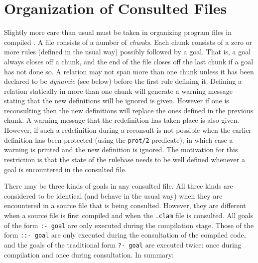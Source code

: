\section{Organization of Consulted Files}
\label{consult-section}

Slightly more care than usual must be taken in organizing program files in
compiled \CLPR. A file consists of a number of {\em chunks}. Each chunk
consists of a zero or more rules (defined in the usual way) possibly followed
by a goal. That is, a goal always closes off a chunk, and the end of the file
closes off the last chunk if a goal has not done so.
\chgbarbegin
A relation may not span more than one chunk unless it has been declared to be
{\em dynamic} (see below) before the first rule defining it. 
Defining a relation statically in more than one chunk will generate
a warning message stating that the new definitions will be ignored is given.
However if one is reconsulting then the new definitions will replace the
ones defined in the previous chunk. A warning message that the redefinition
has taken place is also given.
However, if such a redefinition during a reconsult is not possible when
the earlier definition has been protected (using the {\tt prot/2} predicate),
in which case a warning is printed and the new
definition is ignored.
\chgbarend
The motivation for this restriction is that the state of the rulebase needs to
be well defined whenever a goal is encountered in the consulted file.

There may be three kinds of goals in any consulted file. 
All three kinds are considered to be identical (and behave in the usual way) 
when they are encountered in a source file that is being consulted. 
However, they are different when a source file is first compiled 
and when the {\tt .clam} file is consulted. 
All goals of the form {\tt :- goal}
are only executed during the compilation stage. 
Those of the form {\tt ::- goal}
are only executed during the consultation of the compiled code, and the goals
of the traditional form {\tt ?- goal} are executed twice: once during
compilation and once during consultation. 
In summary:


